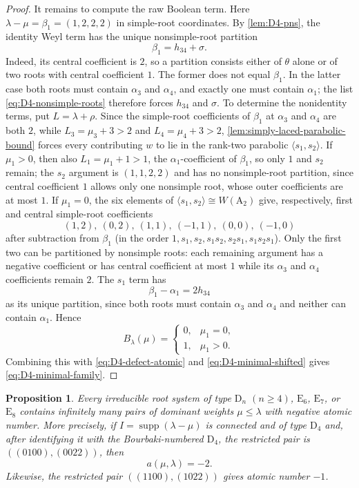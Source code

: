 \documentclass[11pt]{article}
\newtheorem{proposition}[proposition]{Proposition}
\theoremstyle{definition}
\theoremstyle{remark}
\newcommand{\supp}{\operatorname{supp}}
\newcommand{\typeA}{\ensuremath{\mathrm{A}}}
\newcommand{\typeD}{\ensuremath{\mathrm{D}}}
\newcommand{\typeE}{\ensuremath{\mathrm{E}}}
\begin{document}
\begin{proof}
It remains to compute the raw Boolean term.  Here
$\lambda-\mu=\beta_1=(1,2,2,2)$ in simple-root coordinates.
By \cref{lem:D4-pns}, the identity Weyl term has the unique nonsimple-root
partition
\[
       \beta_1=h_{34}+\sigma.
\]
Indeed, its central coefficient is $2$, so a partition consists either of
$\theta$ alone or of two roots with central coefficient $1$.  The former
does not equal $\beta_1$.  In the latter case both roots must contain
$\alpha_3$ and $\alpha_4$, and exactly one must contain $\alpha_1$; the list
\eqref{eq:D4-nonsimple-roots} therefore forces $h_{34}$ and $\sigma$.
To determine the nonidentity terms, put $L=\lambda+\rho$.  Since the simple-root coefficients of $\beta_1$ at $\alpha_3$ and
$\alpha_4$ are both $2$, while $L_3=\mu_3+3>2$ and $L_4=\mu_4+3>2$,
\cref{lem:simply-laced-parabolic-bound} forces every contributing $w$ to lie in
the rank-two parabolic $\langle s_1,s_2\rangle$.  If $\mu_1>0$, then also
$L_1=\mu_1+1>1$, the $\alpha_1$-coefficient of $\beta_1$, so only $1$ and
$s_2$ remain; the $s_2$ argument is
$(1,1,2,2)$ and has no nonsimple-root partition, since central coefficient
$1$ allows only one nonsimple root, whose outer coefficients are at most $1$.
If $\mu_1=0$, the six
elements of $\langle s_1,s_2\rangle\cong W(\typeA_2)$ give, respectively,
first and central simple-root coefficients
\[
 (1,2),\ (0,2),\ (1,1),\ (-1,1),\ (0,0),\ (-1,0)
\]
after subtraction from $\beta_1$ (in the order
$1,s_1,s_2,s_1s_2,s_2s_1,s_1s_2s_1$).  Only the first two can be partitioned
by nonsimple roots: each remaining argument has a negative coefficient or
has central coefficient at most $1$ while its $\alpha_3$ and $\alpha_4$
coefficients remain $2$.  The $s_1$ term has
\[
       \beta_1-\alpha_1=2h_{34}
\]
as its unique partition, since both roots must contain $\alpha_3$ and
$\alpha_4$ and neither can contain $\alpha_1$.  Hence
\[
 B_\lambda(\mu)=
 \begin{cases}
 0,&\mu_1=0,\\
 1,&\mu_1>0.
 \end{cases}
\]
Combining this with \eqref{eq:D4-defect-atomic} and
\eqref{eq:D4-minimal-shifted} gives \eqref{eq:D4-minimal-family}.
\end{proof}

\begin{proposition}
\label{prop:DE-propagation}
Every irreducible root system of type $\typeD_n$ $(n\ge4)$,
$\typeE_6$, $\typeE_7$, or $\typeE_8$ contains infinitely many pairs of
dominant weights $\mu\le\lambda$ with negative atomic number.  More precisely,
if $I=\supp(\lambda-\mu)$ is connected and of type $\typeD_4$ and, after identifying
it with the Bourbaki-numbered $\typeD_4$, the restricted pair is $((0100),(0022))$, then
\[
      a(\mu,\lambda)=-2.
\]
Likewise, the restricted pair $((1100),(1022))$ gives atomic number $-1$.
\end{proposition}
\end{document}
